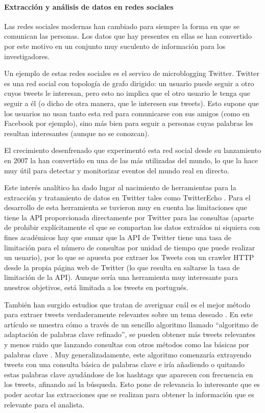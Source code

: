 \paragraph{Extracción y análisis de datos en redes sociales}
Las redes sociales modernas han cambiado para siempre la forma en que se comunican las personas. Los datos que hay presentes en ellas se han convertido por este motivo en un conjunto muy suculento de información para los investigadores. 

Un ejemplo de estas redes sociales es el servico de microblogging Twitter. Twitter es una red social con topología de grafo dirigido: un usuario puede seguir a otro cuyos tweets le interesan, pero esto no implica que el otro usuario le tenga que seguir a él (o dicho de otra manera, que le interesen sus tweets). Esto supone que los usuarios no usan tanto esta red para comunicarse con  sus amigos (como en Facebook por ejemplo), sino más bien para seguir a personas cuyas palabras les resultan interesantes (aunque no se conozcan).

El crecimiento desenfrenado que experimentó esta red social desde su lanzamiento en 2007 la han convertido en una de las más utilizadas del mundo, lo que la hace muy útil para detectar y monitorizar eventos del mundo real en directo.

Este interés analítico ha dado lugar al nacimiento de herramientas para la extracción y tratamiento de datos en Twitter tales como TwitterEcho \cite{Bosnjak2012}. Para el desarrollo de esta herramienta se tuvieron muy en cuenta las limitaciones que tiene la API proporcionada directamente por Twitter para las consultas (aparte de prohibir explícitamente el que se compartan los datos extraídos ni siquiera con fines académicos hay que sumar que la API de Twitter tiene una tasa de limitación para el número de consultas por unidad de tiempo que puede realizar un usuario), por lo que se apuesta por extraer los Tweets con un crawler HTTP desde la propia página web de Twitter (lo que resulta en saltarse la tasa de limitación de la API). Aunque sería una herramienta muy interesante para nuestros objetivos, está limitada a los tweets en portugués.

También han surgido estudios que tratan de averiguar cuál es el mejor método para extraer tweets verdaderamente relevantes sobre un tema deseado \cite{Criado2013}. En este artículo se muestra cómo a través de un sencillo algoritmo llamado ``algoritmo de adaptación de palabras clave refinado'', se pueden obtener más tweets relevantes y menos ruido que lanzando consultas con otros métodos como las básicas por palabras clave . Muy generalizadamente, este algoritmo comenzaría extrayendo tweets con una consulta básica de palabras clave e iría añadiendo o quitando estas palabras clave ayudándose de los hashtags que aparecen con frecuencia en los tweets, afinando así la búsqueda. Esto pone de relevancia lo interesante que es poder acotar las extracciones que se realizan para obtener la información que es relevante para el analista.

